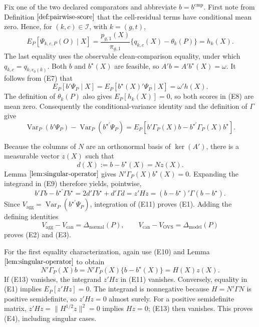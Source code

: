 Fix one of the two declared comparators and abbreviate \(b=b^{\mathrm{cmp}}\).  First note from Definition \(\ref{def:pairwise-score}\) that the cell-residual terms have conditional mean zero.  Hence, for \((k,c)\in\mathcal I\), with \(k=(g,t)\),
\[
 E_P[\Psi_{k,c,P}(O)\mid X]
 =\frac{p_{g,1}(X)}{\pi_{g,1}}\{q_{k,c}(X)-\theta_k(P)\}
 =h_k(X).
\tag{E7}
\]
The last equality uses the observable clean-comparison equality, under which \(q_{k,c}=q_{k,c_0(k)}\).  Both \(b\) and \(b^\star(X)\) are feasible, so \(A'b=A'b^\star(X)=\omega\).  It follows from (E7) that
\[
 E_P[b'\Psi_P\mid X]=E_P[b^\star(X)'\Psi_P\mid X]=\omega'h(X).
\tag{E8}
\]
The definition of \(\theta_k(P)\) also gives \(E_P[h_k(X)]=0\), so both scores in (E8) are mean zero.
Consequently the conditional-variance identity and the definition of \(\Gamma\) give
\[
 \operatorname{Var}_P(b'\Psi_P)-\operatorname{Var}_P(b^{\star\prime}\Psi_P)
 =E_P[b'\Gamma_P(X)b-b^{\star\prime}\Gamma_P(X)b^\star].
\tag{E9}
\]

Because the columns of \(N\) are an orthonormal basis of \(\ker(A')\), there is a measurable vector \(z(X)\) such that
\[
 d(X):=b-b^\star(X)=Nz(X).
\tag{E10}
\]
Lemma \(\ref{lem:singular-operator}\) gives \(N'\Gamma_P(X)b^\star(X)=0\).  Expanding the integrand in (E9) therefore yields, pointwise,
\[
 b'\Gamma b-b^{\star\prime}\Gamma b^\star
 =2d'\Gamma b^\star+d'\Gamma d
 =z'H z
 =(b-b^\star)'\Gamma(b-b^\star).
\tag{E11}
\]
Since \(V_{\mathrm{agg}}=\operatorname{Var}_P(b^{\star\prime}\Psi_P)\), integration of (E11) proves (E1).  Adding the defining identities
\[
 V_{\mathrm{agg}}-V_{\mathrm{can}}=\Delta_{\mathrm{normal}}(P),
 \qquad
 V_{\mathrm{can}}-V_{\mathrm{OVS}}=\Delta_{\mathrm{model}}(P)
\tag{E12}
\]
proves (E2) and (E3).

For the first equality characterization, again use (E10) and Lemma \(\ref{lem:singular-operator}\) to obtain
\[
 N'\Gamma_P(X)b
 =N'\Gamma_P(X)\{b-b^\star(X)\}
 =H(X)z(X).
\tag{E13}
\]
If (E13) vanishes, the integrand \(z'Hz\) in (E11) vanishes.  Conversely, equality in (E1) implies \(E_P[z'Hz]=0\).  The integrand is nonnegative because \(H=N'\Gamma N\) is positive semidefinite, so \(z'H z=0\) almost surely.  For a positive semidefinite matrix, \(z'Hz=\|H^{1/2}z\|^2=0\) implies \(Hz=0\); (E13) then vanishes.  This proves (E4), including singular cases.

